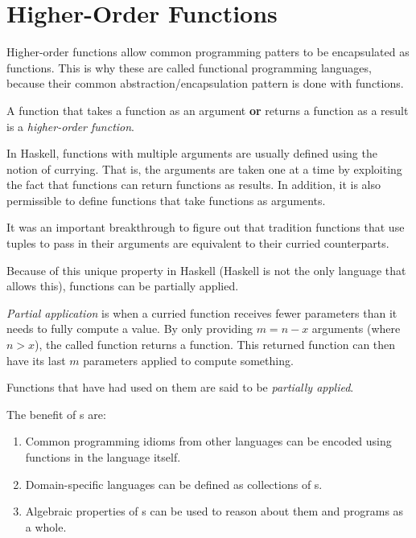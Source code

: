 \section{Higher-Order Functions}\label{sec:Higher_Order_Functions}
Higher-order functions allow common programming patters to be encapsulated as functions.
This is why these are called functional programming languages, because their common abstraction/encapsulation pattern is done with functions.

\begin{definition}\label{def:Higher_Order_Function}
  A function that takes a function as an argument \textbf{or} returns a function as a result is a \emph{higher-order function}.
\end{definition}

In Haskell, functions with multiple arguments are usually defined using the notion of currying.
That is, the arguments are taken one at a time by exploiting the fact that functions can return functions as results.
In addition, it is also permissible to define functions that take functions as arguments.

\begin{remark*}
  It was an important breakthrough to figure out that tradition functions that use tuples to pass in their arguments are equivalent to their curried counterparts.
\end{remark*}

Because of this unique property in Haskell (Haskell is not the only language that allows this), functions can be partially applied.

\begin{definition}\label{def:Partial_Application}
  \emph{Partial application} is when a curried function receives fewer parameters than it needs to fully compute a value.
  By only providing $m=n-x$ arguments (where $n > x$), the called function returns a function.
  This returned function can then have its last $m$ parameters applied to compute something.

  \begin{remark}\label{rmk:Partially_Applied}
    Functions that have had  used on them are said to be \emph{partially applied}.
  \end{remark}
\end{definition}

The benefit of s are:
\begin{enumerate}[noitemsep]
\item Common programming idioms from other languages can be encoded using functions in the language itself.
\item Domain-specific languages can be defined as collections of s.
\item Algebraic properties of s can be used to reason about them and programs as a whole.
\end{enumerate}

